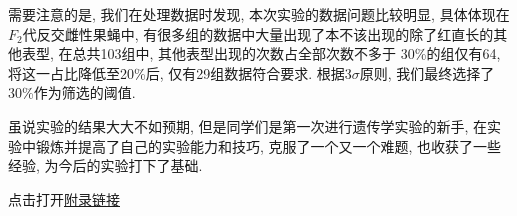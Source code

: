 \documentclass[AutoFakeBold]{LZUThesis}
\begin{document}
需要注意的是, 我们在处理数据时发现, 本次实验的数据问题比较明显, 具体体现在$F_2$代反交雌性果蝇中, 
有很多组的数据中大量出现了本不该出现的除了红直长的其他表型, 在总共103组中, 其他表型出现的次数占全部次数不多于
30\%的组仅有64, 将这一占比降低至20\%后, 仅有29组数据符合要求. 根据3$\sigma$原则, 我们最终选择了30\%作为筛选的阈值. \par

虽说实验的结果大大不如预期, 但是同学们是第一次进行遗传学实验的新手, 在实验中锻炼并提高了自己的实验能力和技巧, 
克服了一个又一个难题, 也收获了一些经验, 为今后的实验打下了基础.\par

\backmatter


\printbib



\Appendix

点击打开\href{https://github.com/zehua0417/GeneticExperimentReport}{附录链接}



\end{document}
